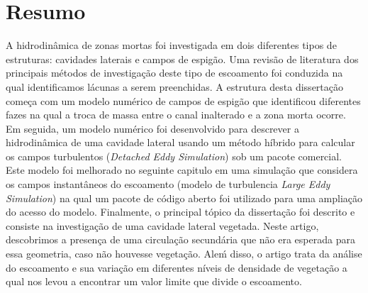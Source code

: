 \chapter*{Resumo}
A hidrodinâmica de zonas mortas foi investigada em dois diferentes tipos de estruturas: cavidades laterais e campos de espigão. Uma revisão de literatura dos principais métodos de investigação deste tipo de escoamento foi conduzida na qual identificamos lácunas a serem preenchidas. A estrutura desta dissertação começa com um modelo numérico de campos de espigão que identificou diferentes fazes na qual a troca de massa entre o canal inalterado e a zona morta ocorre. Em seguida, um modelo numérico foi desenvolvido para descrever a hidrodinâmica de uma cavidade lateral usando um método híbrido para calcular os campos turbulentos (\textit{Detached Eddy Simulation}) sob um pacote comercial. Este modelo foi melhorado no seguinte capitulo em uma simulação que considera os campos instantâneos do escoamento (modelo de turbulencia \textit{Large Eddy Simulation}) na qual um pacote de código aberto foi utilizado para uma ampliação do acesso do modelo. Finalmente, o principal tópico da dissertação foi descrito e consiste na investigação de uma cavidade lateral vegetada. Neste artigo, descobrimos a presença de uma circulação secundária que não era esperada para essa geometria, caso não houvesse vegetação. Aleḿ disso, o artigo trata da análise do escoamento e sua variação em diferentes níveis de densidade de vegetação a qual nos levou a encontrar um valor limite que divide o escoamento.
